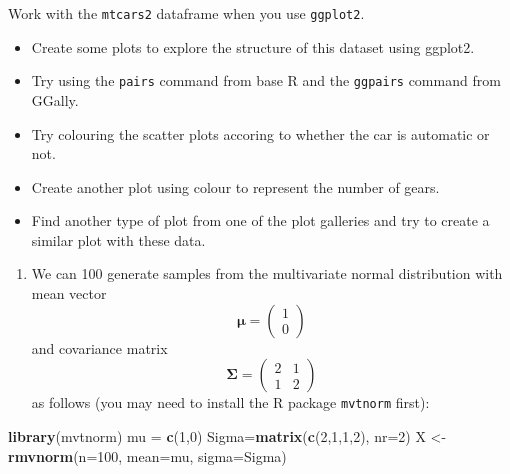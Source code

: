 \documentclass[
]{book}
\newenvironment{Shaded}{\begin{snugshade}}{\end{snugshade}}
\newcommand{\AttributeTok}[1]{\textcolor[rgb]{0.13,0.29,0.53}{#1}}
\newcommand{\DecValTok}[1]{\textcolor[rgb]{0.00,0.00,0.81}{#1}}
\newcommand{\FunctionTok}[1]{\textcolor[rgb]{0.13,0.29,0.53}{\textbf{#1}}}
\newcommand{\NormalTok}[1]{#1}
\newcommand{\OtherTok}[1]{\textcolor[rgb]{0.56,0.35,0.01}{#1}}
\providecommand{\tightlist}{%
  \setlength{\itemsep}{0pt}\setlength{\parskip}{0pt}}
\theoremstyle{definition}
\theoremstyle{definition}
\theoremstyle{definition}
\theoremstyle{definition}
\theoremstyle{remark}
\begin{document}
Work with the \texttt{mtcars2} dataframe when you use \texttt{ggplot2}.

\begin{itemize}
\tightlist
\item
  Create some plots to explore the structure of this dataset using ggplot2.
\item
  Try using the \texttt{pairs} command from base R and the \texttt{ggpairs} command from GGally.
\item
  Try colouring the scatter plots accoring to whether the car is automatic or not.
\item
  Create another plot using colour to represent the number of gears.
\item
  Find another type of plot from one of the plot galleries and try to create a similar plot with these data.
\end{itemize}

\begin{enumerate}
\def\labelenumi{\arabic{enumi}.}
\setcounter{enumi}{3}
\tightlist
\item
  We can 100 generate samples from the multivariate normal distribution with mean vector
  \[{\boldsymbol{\mu}}= \left(\begin{array}{c}1\\0\end{array}\right)\]
  and covariance matrix
  \[\boldsymbol{\Sigma}= \left(\begin{array}{cc}2&1\\1&2\end{array}\right)\]
  as follows (you may need to install the R package \texttt{mvtnorm} first):
\end{enumerate}

\begin{Shaded}
\begin{Highlighting}[]
\FunctionTok{library}\NormalTok{(mvtnorm)}
\NormalTok{mu }\OtherTok{=} \FunctionTok{c}\NormalTok{(}\DecValTok{1}\NormalTok{,}\DecValTok{0}\NormalTok{)}
\NormalTok{Sigma}\OtherTok{=}\FunctionTok{matrix}\NormalTok{(}\FunctionTok{c}\NormalTok{(}\DecValTok{2}\NormalTok{,}\DecValTok{1}\NormalTok{,}\DecValTok{1}\NormalTok{,}\DecValTok{2}\NormalTok{), }\AttributeTok{nr=}\DecValTok{2}\NormalTok{)}
\NormalTok{X }\OtherTok{\textless{}{-}} \FunctionTok{rmvnorm}\NormalTok{(}\AttributeTok{n=}\DecValTok{100}\NormalTok{, }\AttributeTok{mean=}\NormalTok{mu, }\AttributeTok{sigma=}\NormalTok{Sigma)}
\end{Highlighting}
\end{Shaded}
\end{document}
